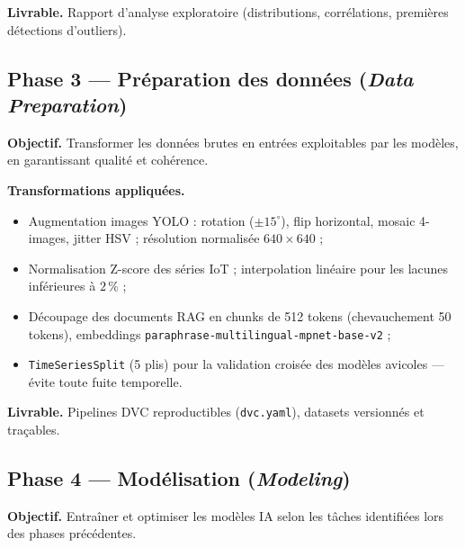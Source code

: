 \textbf{Livrable.} Rapport d'analyse exploratoire (distributions, corrélations,
premières détections d'outliers).

\subsection*{Phase 3 --- Préparation des données (\textit{Data Preparation})}

\textbf{Objectif.} Transformer les données brutes en entrées exploitables par
les modèles, en garantissant qualité et cohérence.

\textbf{Transformations appliquées.}
\begin{itemize}
  \item Augmentation images YOLO : rotation ($\pm15^{\circ}$), flip horizontal,
        mosaic 4-images, jitter HSV ; résolution normalisée $640\times640$ ;
  \item Normalisation Z-score des séries IoT ; interpolation linéaire pour
        les lacunes inférieures à $2\,\%$ ;
  \item Découpage des documents RAG en chunks de 512 tokens (chevauchement
        50 tokens), embeddings \texttt{paraphrase-multilingual-mpnet-base-v2} ;
  \item \texttt{TimeSeriesSplit} (5 plis) pour la validation croisée des
        modèles avicoles --- évite toute fuite temporelle.
\end{itemize}

\textbf{Livrable.} Pipelines DVC reproductibles (\texttt{dvc.yaml}),
datasets versionnés et traçables.

\subsection*{Phase 4 --- Modélisation (\textit{Modeling})}

\textbf{Objectif.} Entraîner et optimiser les modèles IA selon les tâches
identifiées lors des phases précédentes.

